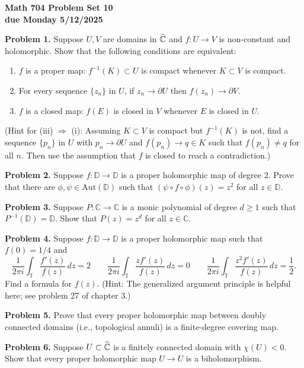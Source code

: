 \documentclass[12pt]{amsart}
\newcommand{\bd}{\partial}
\newcommand{\Chat}{\widehat{\Bbb C}}
\newcommand{\CC}{{\mathbb C}}
\newcommand{\TT}{{\mathbb T}}
\newcommand{\DD}{{\mathbb D}}
\newcommand{\vs}{\vspace{2mm}}
\begin{document}
\begin{center}
{\bf \large Math 704 Problem Set 10} \vs \\
{\bf due Monday 5/12/2025} \vs \vs
\end{center}

\noindent
{\bf Problem 1.} Suppose $U,V$ are domains in $\Chat$ and $f: U \to V$ is non-constant and holomorphic. Show that the following conditions are equivalent: \vs
\begin{enumerate}
\item[(i)]
$f$ is a proper map: $f^{-1}(K) \subset U$ is compact whenever $K \subset V$ is compact. \vs
\item[(ii)]
For every sequence $\{ z_n \}$ in $U$, if $z_n \to \bd U$ then $f(z_n) \to \bd V$. \vs
\item[(iii)]
$f$ is a closed map: $f(E)$ is closed in $V$ whenever $E$ is closed in $U$. \vs
\end{enumerate}   
(Hint for (iii) $\Longrightarrow$ (i): Assuming $K \subset V$ is compact but $f^{-1}(K)$ is not, find a sequence $\{ p_n \}$ in $U$ with  $p_n \to \bd U$ and $f(p_n) \to q \in K$ such that $f(p_n) \neq q$ for all $n$. Then use the assumption that $f$ is closed to reach a contradiction.) \vs

\noindent
{\bf Problem 2.} Suppose $f: \DD \to \DD$ is a proper holomorphic map of degree $2$. Prove that there are $\phi, \psi \in \text{Aut}(\DD)$ such that $(\psi \circ f \circ \phi)(z)=z^2$ for all $z \in \DD$. \vs

\noindent
{\bf Problem 3.} Suppose $P: \CC \to \CC$ is a monic polynomial of degree $d \geq 1$ such that $P^{-1}(\DD)=\DD$. Show that $P(z)=z^d$ for all $z \in \CC$. \vs 

\noindent
{\bf Problem 4.} Suppose $f: \DD \to \DD$ is a proper holomorphic map such that $f(0)=1/4$ and
$$
\frac{1}{2\pi i} \int_{\TT} \frac{f'(z)}{f(z)} \, dz =2 \qquad \frac{1}{2\pi i} \int_{\TT} \frac{zf'(z)}{f(z)} \, dz = 0 \qquad \frac{1}{2\pi i} \int_{\TT} \frac{z^2 f'(z)}{f(z)} \, dz = \frac{1}{2}.
$$
Find a formula for $f(z)$. (Hint: The generalized argument principle is helpful here; see problem 27 of chapter 3.) \vs 

\noindent
{\bf Problem 5.} Prove that every proper holomorphic map between doubly connected domains (i.e., topological annuli) is a finite-degree covering map.    \vs

\noindent
{\bf Problem 6.} Suppose $U \subset \Chat$ is a finitely connected domain with $\chi(U) < 0$. Show that every proper holomorphic map $U \to U$ is a biholomorphism. \vs
\end{document}
